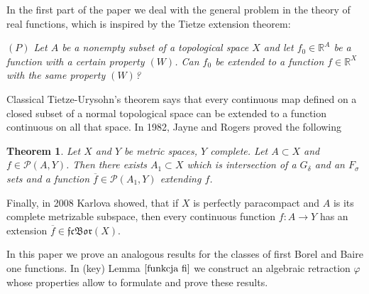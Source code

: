 \documentclass{amsart}
\newtheorem{Th}{Theorem}
\theoremstyle{definition}
\newcommand\mR{{\mathbb R}}
\newcommand\PC{{\mathscr{P}}}
\newcommand\cn{\colon}
\newcommand\ol{\overline}
\newcommand\fs{F_\sigma}
\newcommand\gd{G_\delta}
\newcommand\fcb{\mathfrak{fcBor}}
\newcommand\fii{{\varphi}}
\begin{document}
In the first part of the paper we deal with the general problem in the theory of real functions, which is inspired by the Tietze extension theorem:
\begin{center}\emph{$(P)$ Let $A$ be a nonempty subset of a topological space $X$ and let $f_0\in\mR^A$ be a function with a certain
property $(W)$. Can $f_0$ be extended to a function $f\in\mR^X$ with the same property $(W)$?}\end{center}
Classical Tietze-Urysohn's theorem says that every continuous map defined on a closed subset of a normal topological space can be extended
to a function continuous on all that space. In 1982, Jayne and Rogers \cite{JayRog} proved the following
\begin{Th}\label{Jay_Rog}
Let $X$ and $Y$ be metric spaces, $Y$ complete. Let $A\subset X$ and $f\in\PC(A,Y)$. Then there exists $A_1\subset X$ which is intersection of a $\gd$ and
an $\fs$ sets and a function $\ol{f}\in\PC(A_1,Y)$ extending $f$.
\end{Th}
Finally, in 2008 Karlova \cite{Karlova} showed, that if $X$ is perfectly paracompact and $A$ is its complete metrizable subspace, then every
continuous function $f\cn A\to Y$ has an extension $\ol{f}\in\fcb(X)$.

In this paper we prove an analogous results for the classes of first Borel and Baire one functions. In (key) Lemma $\ref{funkcja fi}$ we construct an
algebraic retraction $\fii$ whose properties allow to formulate and prove these results.
\end{document}
